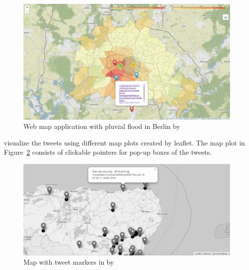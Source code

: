 \begin{figure}[H]
\begin{center}
  \includegraphics[width=13cm]{./images/feng.png}
\end{center}
\caption{Web map application with pluvial flood in Berlin by }
\label{fig:feng}
\end{figure}

 visualize the tweets using different map plots
 created by leaflet. The map plot in Figure~\ref{fig:baker_marker} consists of clickable pointers for pop-up boxes of the tweets.

\begin{figure}[H]
\begin{center}
  \includegraphics[width=13cm]{images/baker_marker.png}
\end{center}
\caption{Map with tweet markers in by }
\label{fig:baker_marker}
\end{figure}

